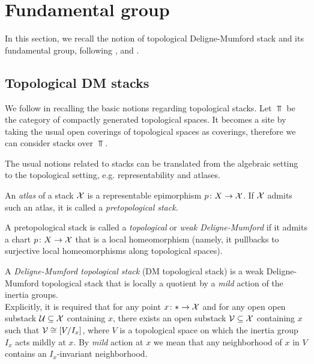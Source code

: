 \section{Fundamental group}

In this section, we recall the notion of topological Deligne-Mumford stack and its fundamental group, following \cite{Noohi-thesis}, \cite{Noohi-foundations} and \cite{Noohi-paper}.

\subsection{Topological DM stacks}

We follow \cite{Noohi-foundations} in recalling the basic notions regarding topological stacks. Let $\Top$ be the category of compactly generated topological spaces. It becomes a site by taking the usual open coverings of topological spaces as coverings, therefore we can consider stacks over $\Top$.

The usual notions related to stacks can be translated from the algebraic setting to the topological setting, e.g. representability and atlases.

\begin{defi}\cite[Definition 7.1]{Noohi-foundations}
An \textit{atlas} of a stack $\mathcal{X}$ is a representable epimorphism $p \colon X \to \mathcal{X}$. If $\mathcal{X}$ admits such an atlas, it is called a \textit{pretopological stack}.
\end{defi}

\begin{defi}\cite[Definition 13.8]{Noohi-foundations}
A pretopological stack is called a \textit{topological} or \textit{weak Deligne-Mumford} if it admits a chart $p \colon X \to \mathcal{X}$ that is a local homeomorphism (namely, it pullbacks to surjective local homeomorphisms along topological spaces). 
\end{defi}

\begin{defi}\cite[Definition 14.3]{Noohi-foundations}
A \textit{Deligne-Mumford topological stack} (DM topological stack) is a weak Deligne-Mumford topological stack that is locally a quotient by a \textit{mild} action of the inertia groups.\\
Explicitly, it is required that for any point $x \colon  * \to \mathcal{X}$ and for any open open substack $\mathcal{U} \subseteq \mathcal{X}$ containing $x$, there exists an open substack $\mathcal{V} \subseteq \mathcal{X}$ containing $x$ such that $\mathcal{V} \cong [V / I_x]$, where $V$ is a topological space on which the inertia group $I_x$ acts mildly at $x$. By \textit{mild} action at $x$ we mean that any neighborhood of $x$ in $V$ contains an $I_x$-invariant neighborhood.
\end{defi}


